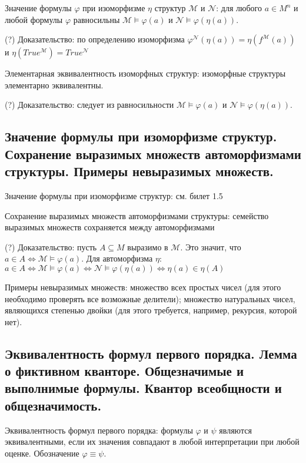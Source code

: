 \documentclass[a4paper, 10pt]{article}
\newcommand{\MM}{\mathcal{M}}
\newcommand{\NN}{\mathcal{N}}
\begin{document}
\hfill

Значение формулы $\varphi$ при изоморфизме $\eta$ структур $\MM$ и $\NN$: для любого $a \in M^n$ и любой формулы $\varphi$ равносильны $\MM \models \varphi(a)$ и $\NN \models \varphi(\eta(a))$.

(?) Доказательство: по определению изоморфизма $\varphi^\NN(\eta(a))=\eta(f^\MM(a))$ и $\eta(True^\MM)=True^\NN$

\hfill

Элементарная эквивалентность изоморфных структур: изоморфные структуры элементарно эквивалентны.

(?) Доказательство: следует из равносильности $\MM \models \varphi(a)$ и $\NN \models \varphi(\eta(a))$.

\subsection{Значение формулы при изоморфизме структур. Сохранение выразимых множеств автоморфизмами структуры. Примеры невыразимых множеств.}

Значение формулы при изоморфизме структур: см. билет 1.5

\hfill

Сохранение выразимых множеств автоморфизмами структуры: семейство выразимых множеств сохраняется между автоморфизмами

(?) Доказательство: пусть $A\subseteq M$ выразимо в $\MM$. Это значит, что $a\in A \iff \MM\models\varphi(a)$. Для автоморфизма $\eta$: $a\in A \iff \MM\models\varphi(a) \iff \NN\models\varphi(\eta(a)) \iff \eta(a) \in \eta(A)$

\hfill

Примеры невыразимых множеств: множество всех простых чисел (для этого необходимо проверять все возможные делители); множество натуральных чисел, являющихся степенью двойки (для этого требуется, например, рекурсия, которой нет).

\subsection{Эквивалентность формул первого порядка. Лемма о фиктивном кванторе. Общезначимые и выполнимые формулы. Квантор всеобщности и общезначимость.}

Эквивалентность формул первого порядка: формулы $\varphi$ и $\psi$ являются эквивалентными, если их значения совпадают в любой интерпретации при любой оценке. Обозначение $\varphi\equiv\psi$.
\end{document}
